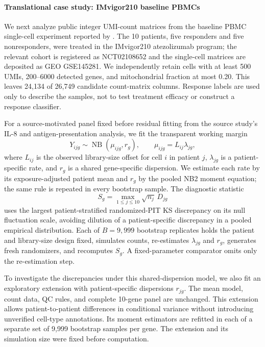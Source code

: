 \documentclass[preprint,12pt]{elsarticle}
\theoremstyle{plain}
\theoremstyle{remark}
\begin{document}
\paragraph{Translational case study: IMvigor210 baseline PBMCs}
We next analyze public integer UMI-count matrices from the baseline PBMC
single-cell experiment reported by \citet{yuen2020il8}. The 10 patients, five
responders and five nonresponders, were treated in the IMvigor210 atezolizumab
program; the relevant cohort is registered as NCT02108652 and the single-cell
matrices are deposited as GEO GSE145281. We independently retain cells with at
least 500 UMIs, 200--6000 detected genes, and mitochondrial fraction at most
0.20. This leaves 24,134 of 26,749 candidate count-matrix columns. Response
labels are used only to describe the samples, not to test treatment efficacy or
construct a response classifier.

For a source-motivated panel fixed before residual fitting from the source
study's IL-8 and antigen-presentation analysis, we fit the transparent working margin
\[
Y_{ijg}\sim\operatorname{NB}(\mu_{ijg},r_g),\qquad
\mu_{ijg}=L_{ij}\lambda_{jg},
\]
where $L_{ij}$ is the observed library-size offset for cell $i$ in patient $j$,
$\lambda_{jg}$ is a patient-specific rate, and $r_g$ is a shared gene-specific
dispersion. We estimate each rate by its exposure-adjusted patient mean and
$r_g$ by the pooled NB2 moment equation; the same rule is repeated in every
bootstrap sample. The diagnostic statistic
\[
S_g=\max_{1\le j\le10}\sqrt{n_j}\,D_{jg}
\]
uses the largest patient-stratified randomized-PIT KS discrepancy on its
null fluctuation scale, avoiding dilution of a patient-specific discrepancy
in a pooled empirical distribution. Each of $B=9,999$ bootstrap replicates holds
the patient and library-size design fixed, simulates counts, re-estimates
$\lambda_{jg}$ and $r_g$, generates fresh randomizers, and recomputes $S_g$. A
fixed-parameter comparator omits only the re-estimation step.

To investigate the discrepancies under this shared-dispersion model, we also
fit an exploratory extension with patient-specific dispersions $r_{jg}$.
The mean model, count data, QC rules, and complete 10-gene panel are unchanged.
This extension allows patient-to-patient differences in conditional variance
without introducing unverified cell-type annotations. Its moment estimators
are refitted in each of a separate set of 9,999 bootstrap samples per gene.
The extension and its simulation size were fixed before computation.
\end{document}

